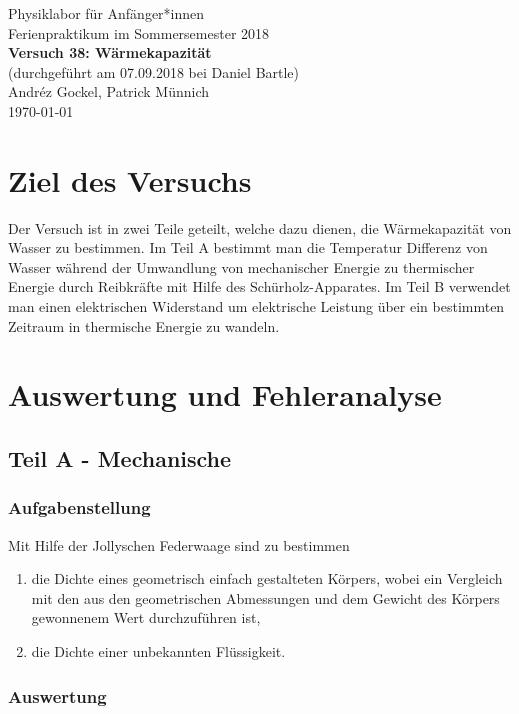 \documentclass[11pt,a4paper]{article}
\begin{document}
{
\centering 
\large 
Physiklabor für Anf\"anger*innen \\
Ferienpraktikum im Sommersemester 2018 \\[4mm]
\textbf{\LARGE 
Versuch 38: Wärmekapazität
} \\[3mm]
(durchgef\"uhrt am 07.09.2018 bei Daniel Bartle) \\
Andréz Gockel, Patrick M\"unnich\\
\today \\[10mm]
}

\section{Ziel des Versuchs}

Der Versuch ist in zwei Teile geteilt, welche dazu dienen, die Wärmekapazität von Wasser zu bestimmen. Im Teil A bestimmt man die Temperatur Differenz von Wasser während der Umwandlung von mechanischer Energie zu thermischer Energie durch Reibkräfte mit Hilfe des Schürholz-Apparates. Im Teil B verwendet man einen elektrischen Widerstand um elektrische Leistung über ein bestimmten Zeitraum in thermische Energie zu wandeln.


\section{Auswertung und Fehleranalyse}


\subsection{Teil A - Mechanische }

\subsubsection{Aufgabenstellung}
Mit Hilfe der Jollyschen Federwaage sind zu bestimmen
\begin{enumerate}
\item{die Dichte eines geometrisch einfach gestalteten K\"orpers, wobei ein Vergleich mit den aus den
geometrischen Abmessungen und dem Gewicht des K\"orpers gewonnenem Wert durchzuf\"uhren
ist,}
\item{die Dichte einer unbekannten Fl\"ussigkeit.}
\end{enumerate}

\subsubsection{Auswertung}
\end{document}
